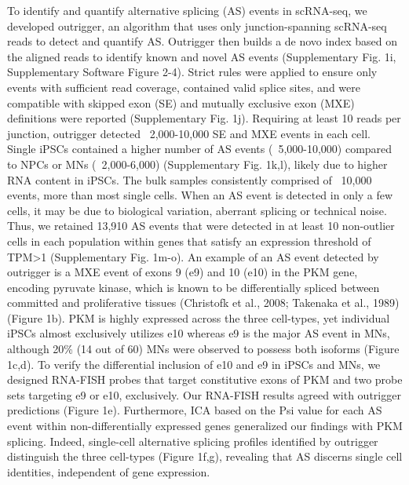 To identify and quantify alternative splicing (AS) events in scRNA-seq, we developed outrigger, an algorithm that uses only junction-spanning scRNA-seq reads to detect and quantify AS. Outrigger then builds a de novo index based on the aligned reads to identify known and novel AS events (Supplementary Fig. 1i, Supplementary Software Figure 2-4). Strict rules were applied to ensure only events with sufficient read coverage, contained valid splice sites, and were compatible with skipped exon (SE) and mutually exclusive exon (MXE) definitions were reported (Supplementary Fig. 1j). Requiring at least 10 reads per junction, outrigger detected ~2,000-10,000 SE and MXE events in each cell. Single iPSCs contained a higher number of AS events (~5,000-10,000) compared to NPCs or MNs (~2,000-6,000) (Supplementary Fig. 1k,l), likely due to higher RNA content in iPSCs. The bulk samples consistently comprised of ~10,000 events, more than most single cells. When an AS event is detected in only a few cells, it may be due to biological variation, aberrant splicing or technical noise. Thus, we retained 13,910 AS events that were detected in at least 10 non-outlier cells in each population within genes that satisfy an expression threshold of TPM>1 (Supplementary Fig. 1m-o). An example of an AS event detected by outrigger is a MXE event of exons 9 (e9) and 10 (e10) in the PKM gene, encoding pyruvate kinase, which is known to be differentially spliced between committed and proliferative tissues (Christofk et al., 2008; Takenaka et al., 1989) (Figure 1b). PKM is highly expressed across the three cell-types, yet individual iPSCs almost exclusively utilizes e10 whereas e9 is the major AS event in MNs, although 20\% (14 out of 60) MNs were observed to possess both isoforms (Figure 1c,d). To verify the differential inclusion of e10 and e9 in iPSCs and MNs, we designed RNA-FISH probes that target constitutive exons of PKM and two probe sets targeting e9 or e10, exclusively. Our RNA-FISH results agreed with outrigger predictions (Figure 1e). Furthermore, ICA based on the Psi value for each AS event within non-differentially expressed genes generalized our findings with PKM splicing. Indeed, single-cell alternative splicing profiles identified by outrigger distinguish the three cell-types (Figure 1f,g), revealing that AS discerns single cell identities, independent of gene expression. 

